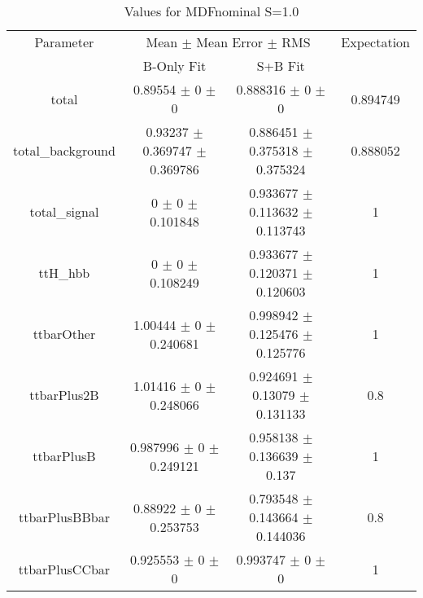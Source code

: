 \begin{table}
\centering
\caption{Values for MDFnominal S=1.0}
\begin{tabular}{cccc}
\toprule
Parameter & \multicolumn{2}{c}{Mean $\pm$ Mean Error $\pm$ RMS} & Expectation\\
 & B-Only Fit & S+B Fit & \\
\midrule
total & \num{0.89554} $\pm$ \num{0} $\pm$ \num{0} & \num{0.888316} $\pm$ \num{0} $\pm$ \num{0} & \num{0.894749}\\
total\_background & \num{0.93237} $\pm$ \num{0.369747} $\pm$ \num{0.369786} & \num{0.886451} $\pm$ \num{0.375318} $\pm$ \num{0.375324} & \num{0.888052}\\
total\_signal & \num{0} $\pm$ \num{0} $\pm$ \num{0.101848} & \num{0.933677} $\pm$ \num{0.113632} $\pm$ \num{0.113743} & \num{1}\\
ttH\_hbb & \num{0} $\pm$ \num{0} $\pm$ \num{0.108249} & \num{0.933677} $\pm$ \num{0.120371} $\pm$ \num{0.120603} & \num{1}\\
ttbarOther & \num{1.00444} $\pm$ \num{0} $\pm$ \num{0.240681} & \num{0.998942} $\pm$ \num{0.125476} $\pm$ \num{0.125776} & \num{1}\\
ttbarPlus2B & \num{1.01416} $\pm$ \num{0} $\pm$ \num{0.248066} & \num{0.924691} $\pm$ \num{0.13079} $\pm$ \num{0.131133} & \num{0.8}\\
ttbarPlusB & \num{0.987996} $\pm$ \num{0} $\pm$ \num{0.249121} & \num{0.958138} $\pm$ \num{0.136639} $\pm$ \num{0.137} & \num{1}\\
ttbarPlusBBbar & \num{0.88922} $\pm$ \num{0} $\pm$ \num{0.253753} & \num{0.793548} $\pm$ \num{0.143664} $\pm$ \num{0.144036} & \num{0.8}\\
ttbarPlusCCbar & \num{0.925553} $\pm$ \num{0} $\pm$ \num{0} & \num{0.993747} $\pm$ \num{0} $\pm$ \num{0} & \num{1}\\
\bottomrule
\end{tabular}
\end{table}